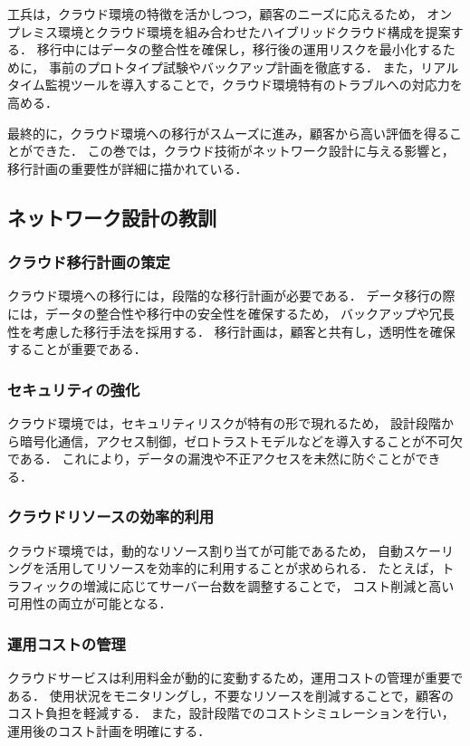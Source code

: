 \documentclass[titlepage,a4paper]{jsarticle}
\begin{document}
工兵は，クラウド環境の特徴を活かしつつ，顧客のニーズに応えるため，
オンプレミス環境とクラウド環境を組み合わせたハイブリッドクラウド構成を提案する．
移行中にはデータの整合性を確保し，移行後の運用リスクを最小化するために，
事前のプロトタイプ試験やバックアップ計画を徹底する．
また，リアルタイム監視ツールを導入することで，クラウド環境特有のトラブルへの対応力を高める．

最終的に，クラウド環境への移行がスムーズに進み，顧客から高い評価を得ることができた．
この巻では，クラウド技術がネットワーク設計に与える影響と，
移行計画の重要性が詳細に描かれている．

\subsection{ネットワーク設計の教訓}
\subsubsection{クラウド移行計画の策定}
クラウド環境への移行には，段階的な移行計画が必要である．
データ移行の際には，データの整合性や移行中の安全性を確保するため，
バックアップや冗長性を考慮した移行手法を採用する．
移行計画は，顧客と共有し，透明性を確保することが重要である．

\subsubsection{セキュリティの強化}
クラウド環境では，セキュリティリスクが特有の形で現れるため，
設計段階から暗号化通信，アクセス制御，ゼロトラストモデルなどを導入することが不可欠である．
これにより，データの漏洩や不正アクセスを未然に防ぐことができる．

\subsubsection{クラウドリソースの効率的利用}
クラウド環境では，動的なリソース割り当てが可能であるため，
自動スケーリングを活用してリソースを効率的に利用することが求められる．
たとえば，トラフィックの増減に応じてサーバー台数を調整することで，
コスト削減と高い可用性の両立が可能となる．

\subsubsection{運用コストの管理}
クラウドサービスは利用料金が動的に変動するため，運用コストの管理が重要である．
使用状況をモニタリングし，不要なリソースを削減することで，顧客のコスト負担を軽減する．
また，設計段階でのコストシミュレーションを行い，運用後のコスト計画を明確にする．
\end{document}
